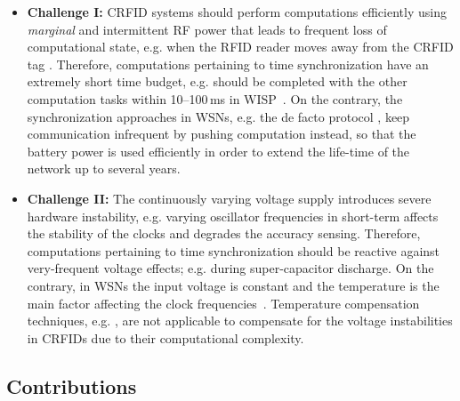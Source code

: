 \documentclass[10pt,journal,compsoc]{IEEEtran}
\begin{document}
\begin{itemize}
	\item \textbf{Challenge I:} CRFID systems should perform computations efficiently using \emph{marginal} and intermittent RF power that leads to frequent loss of computational state, e.g. when the RFID reader moves away from the CRFID tag \cite{ransford:2008}. Therefore, computations pertaining to time synchronization have an extremely short time budget, e.g. should be completed with the other computation tasks within 10--100\,ms in WISP~\cite{Ransford:2011:Mementos}. On the contrary, the synchronization approaches in WSNs, e.g. the de facto protocol \cite{Maroti2004}, keep communication infrequent by pushing computation instead, so that the battery power is used efficiently in order to extend the life-time of the network up to several years.
	
	\item \textbf{Challenge II:} The continuously varying voltage supply introduces severe hardware instability, e.g. varying oscillator frequencies in short-term affects the stability of the clocks and degrades the accuracy sensing. Therefore, computations pertaining to time synchronization should be reactive against very-frequent voltage effects; e.g. during super-capacitor discharge. On the contrary, in WSNs the input voltage is constant and the temperature is the main factor affecting the clock frequencies~\cite{schmid2010interaction}. Temperature compensation techniques, e.g. \cite{Schmid:2009}, are not applicable to compensate for the voltage instabilities in CRFIDs due to their computational complexity.	
	
\end{itemize}

\subsection{Contributions}
\end{document}
